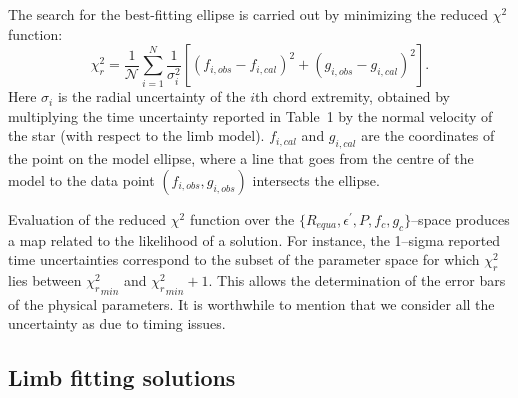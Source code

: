 \documentclass[useAMS,usenatbib]{mn2e}
\begin{document}

The search for the best-fitting ellipse is carried out by minimizing the reduced $\chi^2$ function:
%
\begin{equation}
\chi^2_r = \frac{1}{\mathcal{N}} \sum_{i=1}^N \frac{1}{\sigma_i^2}  \left[ (f_{i,obs}-f_{i,cal})^2 + (g_{i,obs}-g_{i,cal})^2\right].
\end{equation}
%
Here $\sigma_i$ is the radial uncertainty of the $i$th chord extremity, obtained by multiplying the time uncertainty reported in Table~1 by the normal velocity of the star (with respect to the limb model). $f_{i,cal}$ and $g_{i,cal}$ are the coordinates of the point on the model ellipse, where a line that goes from the centre of the model to the data point $(f_{i,obs},g_{i,obs})$ intersects the ellipse.%
%
%
%

Evaluation of the reduced $\chi^2$ function over the $\lbrace R_{equa}, \epsilon^\prime, P, f_c, g_c \rbrace$--space produces a map related to the likelihood of a solution. For instance, the 1--sigma reported time uncertainties correspond to the subset of the parameter space for which $\chi^2_r$ lies between ${\chi^2_r}_{min}$ and ${\chi^2_r}_{min} + 1$. This allows the determination of the error bars of the physical parameters. It is worthwhile to mention that we consider all the uncertainty as due to timing issues.





\subsection{Limb fitting solutions}\label{Sec: limbfitting-2010}
\end{document}
